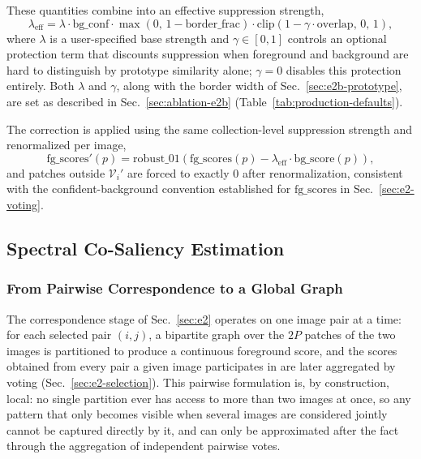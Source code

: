 These quantities combine into an effective suppression strength,
\begin{equation} 
    \lambda_{\mathrm{eff}} = \lambda \cdot \mathrm{bg\_conf}
    \cdot \max(0,\, 1 - \mathrm{border\_frac})
    \cdot \mathrm{clip}(1 - \gamma\cdot\mathrm{overlap},\, 0,\, 1),
    \label{eq:e2b-lambda-eff}
\end{equation}
where $\lambda$ is a user-specified base strength and $\gamma \in [0,1]$
controls an optional protection term that discounts suppression when
foreground and background are hard to distinguish by prototype similarity
alone; $\gamma=0$ disables this protection entirely. Both $\lambda$ and
$\gamma$, along with the border width of Sec.~\ref{sec:e2b-prototype}, are set as described in Sec.~\ref{sec:ablation-e2b} (Table~\ref{tab:production-defaults}).

The correction is applied using the same collection-level suppression strength and renormalized per image,
\begin{equation}
    \mathrm{fg\_scores}'(p) = \mathrm{robust\_01}
    \left(\mathrm{fg\_scores}(p) - \lambda_{\mathrm{eff}} \cdot \mathrm{bg\_score}(p)\right),
    \label{eq:e2b-correction}
\end{equation}
and patches outside $\mathcal{V}_i'$ are forced to exactly $0$ after
renormalization, consistent with the confident-background convention
established for $\mathrm{fg\_scores}$ in Sec.~\ref{sec:e2-voting}.

\subsection{Spectral Co-Saliency Estimation}
\label{sec:e3}

\subsubsection{From Pairwise Correspondence to a Global Graph}
\label{sec:e3-motivation}

The correspondence stage of Sec.~\ref{sec:e2} operates on one image pair at a time: for each selected pair $(i,j)$, a bipartite graph over the $2P$ patches of the two images is partitioned to produce a continuous foreground score, and the scores obtained from every pair a given image participates in are later aggregated by voting (Sec.~\ref{sec:e2-selection}). This pairwise formulation is, by construction, local: no single partition ever has access to more than two images at once, so any pattern that only becomes visible when several images are considered jointly cannot be captured directly by it, and can only be approximated after the fact through the aggregation of independent pairwise votes.

